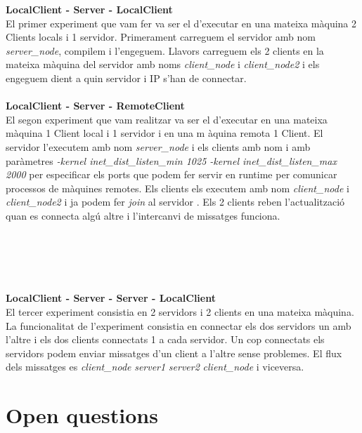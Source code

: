 \documentclass[a4paper, 10pt]{article}
\begin{document}
\begin{itemize}

\textbf{LocalClient - Server - LocalClient}\\
El primer experiment que vam fer va ser el d'executar en una mateixa m\`aquina 2 Clients locals i 1 servidor. Primerament carreguem el servidor amb nom \textit{server\_node}, compilem i l'engeguem. Llavors carreguem els 2 clients en la mateixa m\`aquina del servidor amb noms \textit{client\_node} i \textit{client\_node2} i els engeguem dient a quin servidor i IP s'han de connectar.\\\\

\textbf{LocalClient - Server - RemoteClient}\\
El segon experiment que vam realitzar va ser el d'executar en una mateixa màquina 1 Client local i 1 servidor i en una m \`aquina remota 1 Client. El servidor l'executem amb nom \textit{server\_node} i els clients amb nom i amb par\`ametres \textit{-kernel inet\_dist\_listen\_min 1025 -kernel inet\_dist\_listen\_max 2000} per especificar els ports que podem fer servir en runtime per comunicar processos de m\`aquines remotes. Els clients els executem amb nom \textit{client\_node} i \textit{client\_node2} i ja podem fer \textit{join} al servidor . Els 2 clients reben l'actualitzaci\'o quan es connecta alg\'u altre i l'intercanvi de missatges funciona.\\\\\\\\\\\\

\textbf{LocalClient - Server - Server - LocalClient}\\
El tercer experiment consistia en 2 servidors i 2 clients en una mateixa m\`aquina. La funcionalitat de l'experiment consistia en connectar els dos servidors un amb l'altre i els dos clients connectats 1 a cada servidor. Un cop connectats els servidors podem enviar missatges d'un client a l'altre sense problemes. El flux dels missatges es \textit{client\_node} \rightarrow \textit{server1} \rightarrow \textit{server2} \rightarrow \textit{client\_node} i viceversa.\\

\end{itemize}

\newpage

\section{Open questions}
\end{document}

